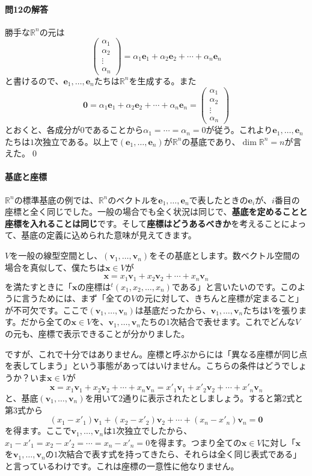 \paragraph{問12の解答} 勝手な$\mathbb{R}^n$の元は
\[
\begin{pmatrix}
\alpha_1 \\
\alpha_2 \\
\vdots \\
\alpha_n
\end{pmatrix}
=
\alpha_1 \bm{e}_1 + \alpha_2 \bm{e}_2 + \cdots + \alpha_n \bm{e}_n
\]
と書けるので、$\bm{e}_1,\ldots,\bm{e}_n$たちは$\mathbb{R}^n$を生成する。また
\[
\bm{0} = \alpha_1 \bm{e}_1 + \alpha_2 \bm{e}_2 + \cdots + \alpha_n \bm{e}_n
=
\begin{pmatrix}
\alpha_1 \\
\alpha_2 \\
\vdots \\
\alpha_n
\end{pmatrix}
\]
とおくと、各成分が$0$であることから$\alpha_1 = \cdots = \alpha_n = 0$が従う。これより$\bm{e}_1,\ldots,\bm{e}_n$たちは$1$次独立である。以上で$(\bm{e}_1,\ldots,\bm{e}_n)$が$\mathbb{R}^n$の基底であり、$\dim \mathbb{R}^n = n$が言えた。\qed

\paragraph{基底と座標}

$\mathbb{R}^n$の標準基底の例では、$\mathbb{R}^n$のベクトルを$\bm{e}_1,\ldots,\bm{e}_n$で表したときの$\bm{e}_i$が、$i$番目の座標と全く同じでした。一般の場合でも全く状況は同じで、\textbf{基底を定めることと座標を入れることは同じ}です。そして\textbf{座標はどうあるべきか}を考えることによって、基底の定義に込められた意味が見えてきます。

$V$を一般の線型空間とし、$(\bm{v}_1,\ldots,\bm{v}_n)$をその基底とします。数ベクトル空間の場合を真似して、僕たちは$\bm{x}\in V$が
\[
\bm{x} = x_1\bm{v}_1 + x_2\bm{v}_2 + \cdots + x_n\bm{v}_n
\]
を満たすときに「$\bm{x}$の座標は${}^t (x_1, x_2, \ldots, x_n)$である」と言いたいのです。このように言うためには、まず「全ての$V$の元に対して、きちんと座標が定まること」が不可欠です。ここで$(\bm{v}_1,\ldots,\bm{v}_n)$は基底だったから、$\bm{v}_1,\ldots,\bm{v}_n$たちは$V$を張ります。だから全ての$\bm{x} \in V$を、$\bm{v}_1,\ldots,\bm{v}_n$たちの$1$次結合で表せます。これでどんな$V$の元も、座標で表示できることが分かりました。

ですが、これで十分ではありません。座標と呼ぶからには「異なる座標が同じ点を表してしまう」という事態があってはいけません。こちらの条件はどうでしょうか？いま$\bm{x} \in V$が
\[
\bm{x} = x_1\bm{v}_1 + x_2\bm{v}_2 + \cdots + x_n\bm{v}_n = x'_1 \bm{v}_1 + x'_2\bm{v}_2 + \cdots + x'_n \bm{v}_n
\]
と、基底$(\bm{v}_1,\ldots,\bm{v}_n)$を用いて$2$通りに表示されたとしましょう。すると第$2$式と第$3$式から
\[
(x_1 - x'_1)\bm{v}_1 + (x_2 - x'_2)\bm{v}_2 + \cdots + (x_n - x'_n)\bm{v}_n = \bm{0}
\]
を得ます。ここで$\bm{v}_1,\ldots,\bm{v}_n$は$1$次独立でしたから、$x_1 - x'_1 = x_2 - x'_2 = \cdots = x_n - x'_n = 0$を得ます。つまり全ての$\bm{x} \in V$に対し「$\bm{x}$を$\bm{v}_1,\ldots,\bm{v}_n$の$1$次結合で表す式を持ってきたら、それらは全く同じ表式である」と言っているわけです。これは座標の一意性に他なりません。

